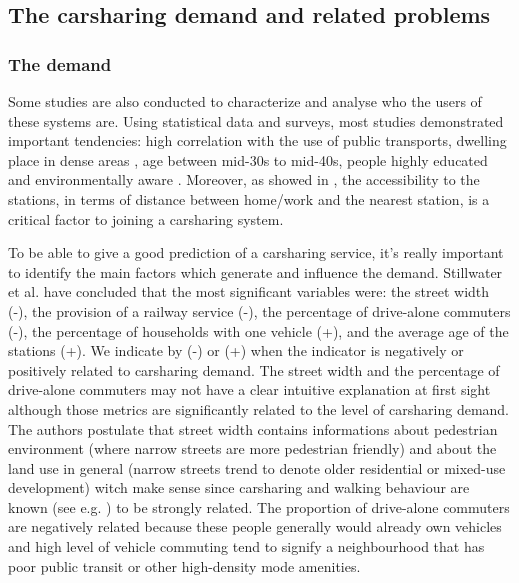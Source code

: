 \begin{bibunit}[ieeetr]
\subsection{The carsharing demand and related problems}

\subsubsection{The demand}
Some studies are also conducted to characterize and analyse who the users of these systems are.
Using statistical data and surveys, most studies demonstrated important tendencies: high correlation with the use of public transports, dwelling place in dense areas \cite{cervero_city_2003, millard_ball_car_sharing_2005, burkhardt_who_2006}, age between mid-30s to mid-40s, people highly educated and environmentally aware \cite{costain_synopsis_2012, efthymiou_which_2012, millard_ball_car_sharing_2005, brook_carsharingstart_2004, lane_phillycarshare_2005, zheng_carsharing_2009}.
Moreover, as showed in \cite{costain_synopsis_2012, efthymiou_which_2012, zheng_carsharing_2009}, the accessibility to the stations, in terms of distance between home/work and the nearest station, is a critical factor to joining a carsharing system.

To be able to give a good prediction of a carsharing service, it's really important to identify the main factors which generate and influence the demand.
Stillwater et al. \cite{stillwater_carsharing_2009} have concluded that the most significant variables were: the street width (-), the provision of a railway service (-), the percentage of drive-alone commuters (-), the percentage of households with one vehicle (+), and the average age of the stations (+).
We indicate by (-) or (+) when the indicator is negatively or positively related to carsharing demand.
The street width and the percentage of drive-alone commuters may not have a clear intuitive explanation at first sight although those metrics are significantly related to the level of carsharing demand.
The authors postulate that street width contains informations about pedestrian environment (where narrow streets are more pedestrian friendly) and about the land use in general (narrow streets trend to denote older residential or mixed-use development) witch make sense since carsharing and walking behaviour are known (see e.g. \cite{cervero_city_2003}) to be strongly related.
The proportion of drive-alone commuters are negatively related because these people generally would already own vehicles and high level of vehicle commuting tend to signify a neighbourhood that has poor public transit or other high-density mode amenities.


\end{bibunit}
